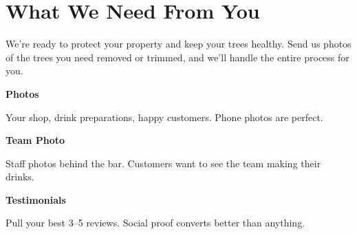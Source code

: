 \documentclass[11pt,letterpaper]{article}
\begin{document}
\vspace{0.2em}

\section*{What We Need From You}

We’re ready to protect your property and keep your trees healthy. Send us photos of the trees you need removed or trimmed, and we’ll handle the entire process for you.

\vspace{0.12em}

\noindent\begin{minipage}[t]{0.48\textwidth}
\begin{tcolorbox}[colframe=accent-teal, boxrule=1pt, left=0.7em, right=0.7em, top=0.5em, bottom=0.5em, arc=4pt, boxsep=0pt]
{\bfseries\small\color{accent-teal}Photos}

\vspace{0.15em}

{\small Your shop, drink preparations, happy customers. Phone photos are perfect.}
\end{tcolorbox}

\vspace{0.1em}

\begin{tcolorbox}[colframe=accent-teal, boxrule=1pt, left=0.7em, right=0.7em, top=0.5em, bottom=0.5em, arc=4pt, boxsep=0pt]
{\bfseries\small\color{accent-teal}Team Photo}

\vspace{0.15em}

{\small Staff photos behind the bar. Customers want to see the team making their drinks.}
\end{tcolorbox}

\vspace{0.1em}

\begin{tcolorbox}[colframe=accent-teal, boxrule=1pt, left=0.7em, right=0.7em, top=0.5em, bottom=0.5em, arc=4pt, boxsep=0pt]
{\bfseries\small\color{accent-teal}Testimonials}

\vspace{0.15em}

{\small Pull your best 3--5 reviews. Social proof converts better than anything.}
\end{tcolorbox}
\end{minipage}
\hfill
\end{document}
